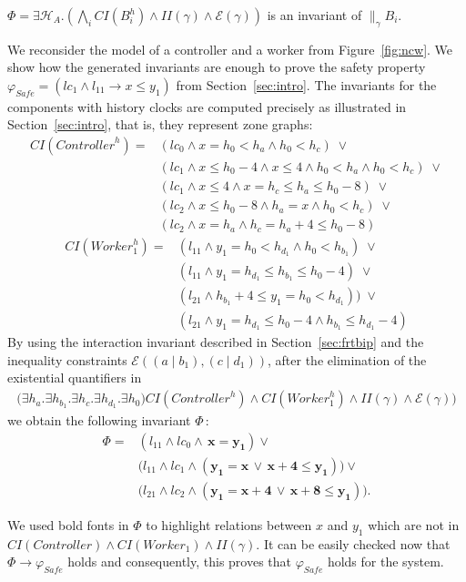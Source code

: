 \documentclass{LMCS}
\newcommand{\hp}{\mathcal{H}_A}
\newcommand{\eqs}{\mathcal{E}}
\newcommand{\cn}{\mathit{B}\xspace}
\newcommand{\ctn}{\mathit{Controller}}
\newcommand{\cwkO}{\mathit{Worker}_1}
\newcommand{\ic}{\mathit{CI}}
\newcommand{\iim}{\mathit{II}}
\newcommand{\te}{h_0}
\theoremstyle{plain}\newtheorem{remark}[thm]{Remark}
\theoremstyle{plain}\newtheorem{example}[thm]{Example}
\begin{document}
\begin{cor}
  $\Phi = \exists \hp. (\bigwedge_i \ic(\cn_i^h) \wedge \iim(\gamma) \wedge
\eqs(\gamma))$ is an invariant of $\|_{\gamma} \cn_i$.
\end{cor}

\begin{exa} 
\label{eg:hc}
We reconsider the model of a controller and a worker from
Figure~\ref{fig:ncw}. We show how the generated invariants are enough
to prove the safety property $\varphi_\mathit{Safe} = (lc_1 \wedge
l_{11} \rightarrow x \leq y_1)$ from Section~\ref{sec:intro}. The
invariants for the components with history clocks are computed
precisely as illustrated in Section~\ref{sec:intro}, that is, they
represent zone graphs:
\begin{align*}
 \ic(\ctn^{h}) = 
& (lc_0 \wedge x = \te < h_a \wedge \te < h_c    )\; {\vee}  \\
& (lc_1 \wedge x \leq \te - 4 \wedge  x \leq 4 \wedge \te  < h_a  \wedge \te < h_c  ) \; {\vee}\\
& (lc_1 \wedge x \leq 4 \wedge  x = h_c \leq h_a \leq \te - 8)\; {\vee}\\
& (lc_2 \wedge x \leq \te - 8 \wedge h_a=x \wedge  \te < h_c  ) \; \vee \\
& (lc_2 \wedge x=h_{a} \wedge  h_{c}=h_{a} + 4 \leq \te - 8)
\end{align*}
\begin{align*}
\ic(   \cwkO^{h}) = 
& (l_{11} \wedge y_1 = \te < h_{d_1}  \wedge \te < h_{b_1}  ) \; {\vee}  \\
& (l_{11} \wedge  y_1 = h_{d_1}  \leq h_{b_1} \leq \te - 4) \; {\vee} \\
& (l_{21} \wedge h_{b_1}+4 \leq y_1 =\te    < h_{d_1}   )) \; {\vee} \\
& (l_{21} \wedge y_1 =h_{d_1}  \leq \te - 4 \wedge h_{b_1} \leq h_{d_1} - 4 )
\end{align*}
By using the interaction invariant described in Section~\ref{sec:frtbip}
 and the inequality constraints $\eqs( (a\mid b_1), (c\mid d_1) )$,
 after the elimination of the existential quantifiers in 
\begin{align*}
\big(\exists h_a.\exists h_{b_1}.\exists h_c.\exists
h_{d_1}.\exists h_{0}\big) \ic(\ctn^{h}) \wedge \ic(\cwkO^{h}) \wedge \iim(\gamma)
\wedge \eqs(\gamma)\big)
\end{align*}
we obtain the following invariant $\Phi$\,:
\begin{align*}
\Phi =  
& (l_{11}\wedge lc_{0} \wedge\, \bm{x=y_1}) \vee \\
& \big(l_{11}\wedge lc_{1} \wedge (\bm{y_1=x\,\vee\,x+4 \leq y_1 })\big) \vee\\
& \big(l_{21}\wedge lc_{2} \wedge \bm{(y_1=x+4\,\vee\, x+8 \leq y_1 )}\big).
\end{align*}

We used bold fonts in $\Phi$ to highlight relations between $x$ and
$y_1$ which are not in $\ic(\ctn) \wedge \ic(\cwkO) \wedge
\iim(\gamma)$. It can be easily checked now that $\Phi \rightarrow
\varphi_{Safe}$ holds and consequently, this proves that
$\varphi_{Safe}$ holds for the system.
\end{exa}
\end{document}
